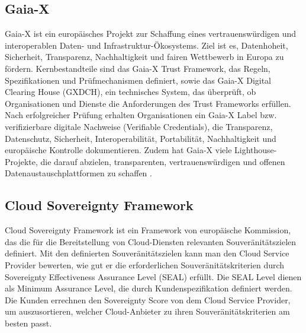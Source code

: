 \subsection{Gaia-X} 
\label{sec:gaia-x}
Gaia-X \cite{GaiaXOverview2025} ist ein europäisches Projekt zur Schaffung eines vertrauenswürdigen und interoperablen Daten- und Infrastruktur-Ökosystems. Ziel ist es, Datenhoheit, Sicherheit, Transparenz, Nachhaltigkeit und fairen Wettbewerb in Europa zu fördern. Kernbestandteile sind das Gaia-X Trust Framework, das Regeln, Spezifikationen und Prüfmechanismen definiert, sowie das Gaia-X Digital Clearing House (GXDCH), ein technisches System, das überprüft, ob Organisationen und Dienste die Anforderungen des Trust Frameworks erfüllen. Nach erfolgreicher Prüfung erhalten Organisationen ein Gaia-X Label bzw. verifizierbare digitale Nachweise (Verifiable Credentials), die Transparenz, Datenschutz, Sicherheit, Interoperabilität, Portabilität, Nachhaltigkeit und europäische Kontrolle dokumentieren. Zudem hat Gaia-X viele Lighthouse-Projekte, die darauf abzielen, transparenten, vertrauenswürdigen und offenen Datenaustauschplattformen zu schaffen \cite{gaiax2022lighthouse}. 

\subsection{Cloud Sovereignty Framework} 
Cloud Sovereignty Framework \cite{EC_CloudSovereigntyFramework_2025} ist ein Framework von europäische Kommission, das die für die Bereitstellung von Cloud-Diensten relevanten Souveränitätszielen definiert.
Mit den definierten Souveränitätszielen kann man den Cloud Service Provider bewerten, wie gut er die erforderlichen Souveränitätskriterien durch Sovereignty Effectiveness Assurance Level (SEAL) erfüllt. Die SEAL Level dienen als Minimum Assurance Level, die durch Kundenspezifikation definiert werden. Die Kunden errechnen den Sovereignty Score von dem Cloud Service Provider, um auszusortieren, welcher Cloud-Anbieter zu ihren Souveränitätskriterien am besten passt.

